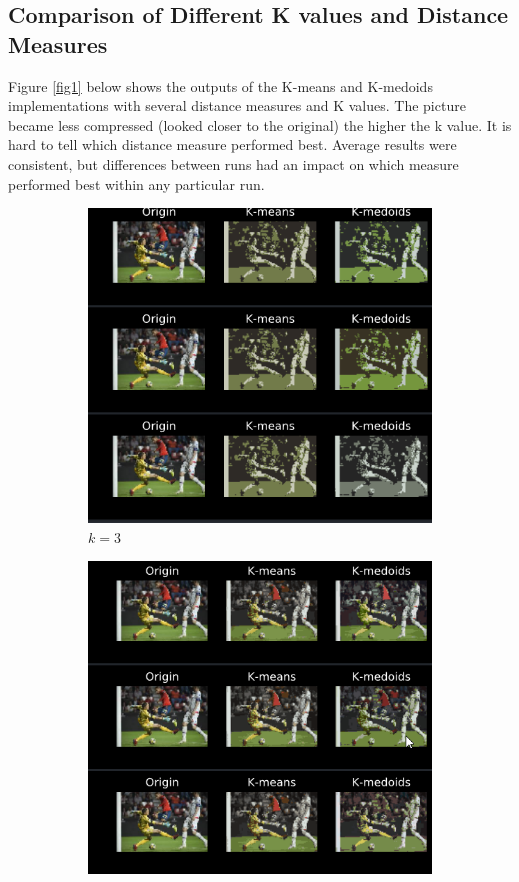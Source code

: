 \documentclass[a4paper]{article}
\begin{document}
\subsection{Comparison of Different K values and Distance Measures}
 Figure \ref{fig1} below shows the outputs of the K-means and K-medoids implementations with several distance measures and K values. The picture became less compressed (looked closer to the original) the higher the k value.  It is hard to tell which distance measure performed best.  Average results were consistent, but differences between runs had an impact on which measure performed best within any particular run.
	\begin{figure}[h]
		
    \centering
    \begin{subfigure}[b]{0.3\textwidth}
        \includegraphics[width=\textwidth]{k_3.png}
        \caption{$k=3$}
        \label{fig:k_3}
    \end{subfigure}
    \begin{subfigure}[b]{0.3\textwidth}
        \includegraphics[width=\textwidth]{k_15.png}

\end{subfigure}
\end{figure}
\end{document}
